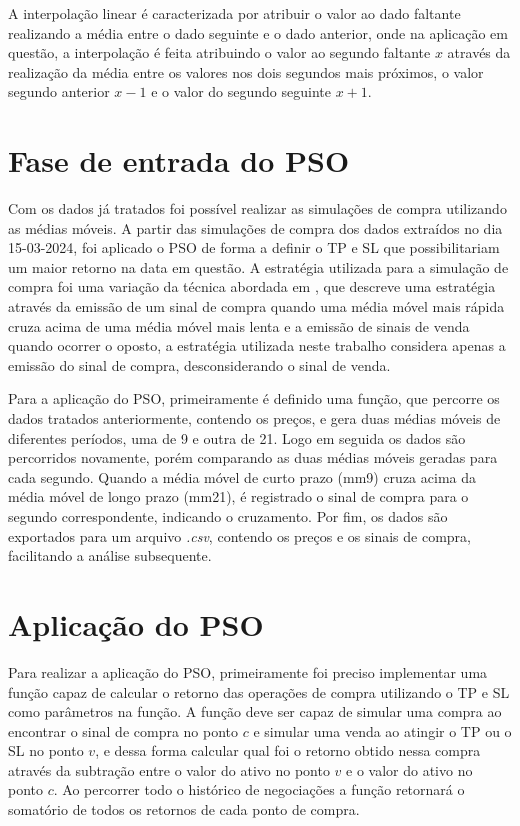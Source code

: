 \documentclass{iftex2024}
\begin{document}
A interpolação linear é caracterizada por
atribuir o valor ao dado faltante realizando a média entre o dado seguinte e o dado anterior,
onde na aplicação em questão, a interpolação é feita atribuindo o valor ao segundo faltante
$x$ através da realização da média entre os valores nos dois segundos mais próximos, o valor
segundo anterior $x-1$ e o valor do segundo seguinte $x+1$.

\section{Fase de entrada do PSO}

Com os dados já tratados foi possível realizar as simulações de compra utilizando
as médias móveis. A partir das simulações de compra dos dados extraídos no dia 15-03-2024, foi aplicado 
o PSO de forma a definir o TP e SL que possibilitariam um maior retorno na data em questão. 
A estratégia utilizada para a simulação de compra foi uma variação da
técnica abordada em \textcite{PAPAILIAS2015458}, que descreve uma estratégia através da
emissão de um sinal de compra quando uma média móvel mais rápida cruza acima de
uma média móvel mais lenta e a emissão de sinais de venda quando ocorrer
o oposto, a estratégia utilizada neste trabalho considera apenas a emissão do sinal de
compra, desconsiderando o sinal de venda.

Para a aplicação do PSO, primeiramente é definido uma função, que percorre os dados tratados
anteriormente, contendo os preços, e gera duas médias móveis de diferentes períodos,
uma de 9 e outra de 21. Logo em seguida os dados são percorridos novamente, porém
comparando as duas médias móveis geradas para cada segundo. Quando a média móvel
de curto prazo (mm9) cruza acima da média móvel de longo prazo (mm21), é registrado
o sinal de compra para o segundo correspondente, indicando o cruzamento. Por fim, os
dados são exportados para um arquivo \textit{.csv}, contendo os preços e os sinais de compra,
facilitando a análise subsequente.

\section{Aplicação do PSO}

Para realizar a aplicação do PSO, primeiramente foi preciso implementar uma
função capaz de calcular o retorno das operações de compra utilizando o TP e SL como
parâmetros na função. A função deve ser capaz de simular uma compra ao encontrar o
sinal de compra no ponto $c$ e simular uma venda ao atingir o TP ou o SL no ponto $v$, e
dessa forma calcular qual foi o retorno obtido nessa compra através da subtração entre o
valor do ativo no ponto $v$ e o valor do ativo no ponto $c$. Ao percorrer todo o histórico de
negociações a função retornará o somatório de todos os retornos de cada ponto de compra.
\end{document}
